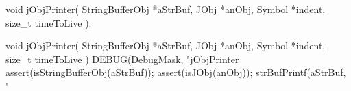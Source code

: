 \startTestSuite[jObjPrinter]

\startCHeader
void jObjPrinter(
  StringBufferObj *aStrBuf,
  JObj            *anObj,
  Symbol          *indent,
  size_t          timeToLive
);
\stopCHeader

\startCCode
void jObjPrinter(
  StringBufferObj *aStrBuf,
  JObj            *anObj,
  Symbol          *indent,
  size_t           timeToLive
) {
  DEBUG(DebugMask, "jObjPrinter %
  assert(isStringBufferObj(aStrBuf));
  assert(isJObj(anObj));
  strBufPrintf(aStrBuf, "%
}
\stopCCode


\skipTestCase
\stopTestSuite